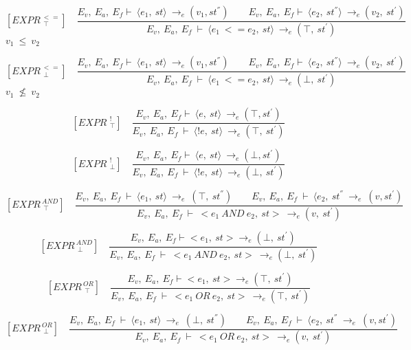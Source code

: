    	\[
   	[EXPR^{\ <=}_{\ \ \top}] \quad
   	\dfrac{E_v, \ E_a, \ E_f \vdash \ \langle e_1, \ st \rangle \ \rightarrow_e (v_1, st^{''}) \qquad E_v, \ E_a, \ E_f \vdash \ \langle e_2, \ st^{''} \rangle \ \rightarrow_e (v_2, \ st^{'})}{E_v, \ E_a, \ E_f \ \vdash \ \langle e_1 \ <= e_2, \ st \rangle \ \rightarrow_e (\top, \ st^{'})}
   	\]
	\begin{math}
   	v_1 \ \le \ v_2
   	\end{math}   	
   	

   	\[
   	[EXPR^{\ <=}_{\ \ \bot}] \quad
   	\dfrac{E_v, \ E_a, \ E_f \vdash \ \langle e_1, \ st \rangle \ \rightarrow_e (v_1, st^{''}) \qquad E_v, \ E_a, \ E_f \vdash \ \langle e_2, \ st^{''} \rangle \ \rightarrow_e (v_2, \ st^{'})}{E_v, \ E_a, \ E_f \ \vdash \ \langle e_1 \ <= e_2, \ st \rangle \ \rightarrow_e (\bot, \ st^{'})}
   	\]
	\begin{math}
   	v_1 \ \nleq \ v_2
   	\end{math}
   	
   	\[
   	[EXPR^{\ \ !}_{\ \ \top}] \quad
   	\dfrac{E_v, \ E_a, \ E_f \vdash \ \langle e, \ st \rangle \ \rightarrow_e (\top, st^{'})}{E_v, \ E_a, \ E_f \ \vdash \ \langle !e, \ st \rangle \ \rightarrow_e (\top, \ st^{'})}
   	\]  	  	

   	\[
   	[EXPR^{\ \ !}_{\ \ \bot}] \quad
   	\dfrac{E_v, \ E_a, \ E_f \vdash \ \langle e, \ st \rangle \ \rightarrow_e (\bot, st^{'})}{E_v, \ E_a, \ E_f \ \vdash \ \langle !e, \ st \rangle \ \rightarrow_e (\bot, \ st^{'})}
   	\]
   	
   	
   	\[
   	[EXPR^{\ AND}_{\ \ \top}] \quad
   	\dfrac{E_v, \ E_a, \ E_f \ \vdash \ \langle e_1, \ st \rangle \ \rightarrow_e \ (\top, \ st^{''}) \qquad E_v, \ E_a, \ E_f \ \vdash \ \langle e_2, \ st^{''} \ \rightarrow_e \ (v, st^{'})}{E_v, \ E_a, \ E_f \ \vdash \ <e_1 \ AND \ e_2, \ st> \ \rightarrow_e (v, \ st^{'})}
   	\]  	
   	
   	\[
   	[EXPR^{\ AND}_{\ \ \bot}] \quad
   	\dfrac{E_v, \ E_a, \ E_f \vdash <e_1, \ st> \rightarrow_e (\bot, \ st^{'}) }{E_v, \ E_a, \ E_f \ \vdash \ <e_1 \ AND \ e_2, \ st> \ \rightarrow_e (\bot, \ st^{'})}
   	\]
   	
   	
   	\[
   	[EXPR^{\ OR}_{\ \ \top}] \quad
   	\dfrac{E_v, \ E_a, \ E_f \vdash <e_1, \ st> \rightarrow_e (\top, \ st^{'}) }{E_v, \ E_a, \ E_f \ \vdash \ <e_1 \ OR \ e_2, \ st> \ \rightarrow_e (\top, \ st^{'})}
   	\]
   	
   	\[
   	[EXPR^{\ OR}_{\ \ \bot}] \quad
   	\dfrac{E_v, \ E_a, \ E_f \ \vdash \ \langle e_1, \ st \rangle \ \rightarrow_e \ (\bot, \ st^{''}) \qquad E_v, \ E_a, \ E_f \ \vdash \ \langle e_2, \ st^{''} \ \rightarrow_e \ (v, st^{'})}{E_v, \ E_a, \ E_f \ \vdash \ <e_1 \ OR \ e_2, \ st> \ \rightarrow_e (v, \ st^{'})}
   	\] 	
   	
   	
   	

